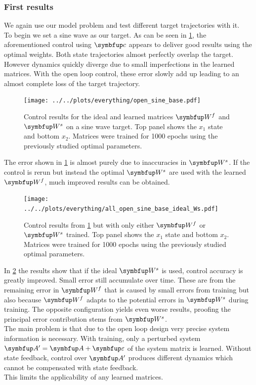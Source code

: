 \subsubsection{First results}
We again use our model problem and test different target trajectories with it.\\
To begin we set a sine wave as our target. As can be seen in \cref{fig:all_open_sine_base}, the aforementioned control using $\bmu{c}$ appears to deliver good results using the optimal weights. Both state trajectories almost perfectly overlap the target. However dynamics quickly diverge due to small imperfections in the learned matrices. With the open loop control, these error slowly add up leading to an almost complete loss of the target trajectory.
\begin{figure}
	\centering
	\texttt{[image: ../../plots/everything/open\_sine\_base.pdf]}
	\caption{Control results for the ideal and learned matrices $\bmu{W}^f$ and $\bmu{W}^s$ on a sine wave target. Top panel shows the $x_1$ state and bottom $x_2$. Matrices were trained for 1000 epochs using the previously studied optimal parameters.}
	\label{fig:all_open_sine_base}
\end{figure}
The error shown in \cref{fig:all_open_sine_base} is almost purely due to inaccuracies in $\bmu{W}^s$. If the control is rerun but instead the optimal $\bmu{W}^s$ are used with the learned $\bmu{W}^f$, much improved results can be obtained.\\
\begin{figure}
	\centering
	\texttt{[image: ../../plots/everything/all\_open\_sine\_base\_ideal\_Ws.pdf]}
	\caption{Control results from \cref{fig:all_open_sine_base} but with only either $\bmu{W}^f$ or $\bmu{W}^s$ trained. Top panel shows the $x_1$ state and bottom $x_2$. Matrices were trained for 1000 epochs using the previously studied optimal parameters.}
	\label{fig:all_open_sine_base_ideal_Ws}
\end{figure}
In \cref{fig:all_open_sine_base_ideal_Ws} the results show that if the ideal $\bmu{W}^s$ is used, control accuracy is greatly improved. Small error still accumulate over time. These are from the remaining error in $\bmu{W}^f$ that is caused by small errors from training but also because $\bmu{W}^f$ adapts to the potential errors in $\bmu{W}^s$ during training. The opposite configuration yields even worse results, proofing the principal error contribution stems from $\bmu{W}^s$.\\
The main problem is that due to the open loop design very precise system information is necessary. With training, only a perturbed system $\bmu{A}' = \bmu{A} + \bmu{\varepsilon}$ of the system matrix is learned. Without state feedback, control over $\bmu{A}'$ produces different dynamics which cannot be compensated with state feedback.\\
This limits the applicability of any learned matrices.
